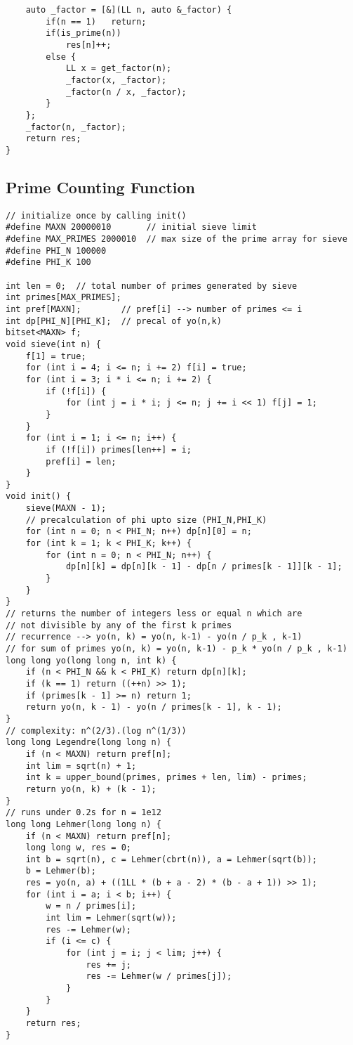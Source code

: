\documentclass[FSZ,a4paper,onesided]{article}
\begin{document}
\begin{multicols*}{\COLS}
\begin{lstlisting}
    auto _factor = [&](LL n, auto &_factor) {
        if(n == 1)   return;
        if(is_prime(n)) 
            res[n]++;
        else {
            LL x = get_factor(n);
            _factor(x, _factor);
            _factor(n / x, _factor);
        }
    };
    _factor(n, _factor);
    return res;
}
\end{lstlisting}
\subsection{Prime Counting Function}
\begin{lstlisting}
// initialize once by calling init()
#define MAXN 20000010       // initial sieve limit
#define MAX_PRIMES 2000010  // max size of the prime array for sieve
#define PHI_N 100000
#define PHI_K 100

int len = 0;  // total number of primes generated by sieve
int primes[MAX_PRIMES];
int pref[MAXN];        // pref[i] --> number of primes <= i
int dp[PHI_N][PHI_K];  // precal of yo(n,k)
bitset<MAXN> f;
void sieve(int n) {
    f[1] = true;
    for (int i = 4; i <= n; i += 2) f[i] = true;
    for (int i = 3; i * i <= n; i += 2) {
        if (!f[i]) {
            for (int j = i * i; j <= n; j += i << 1) f[j] = 1;
        }
    }
    for (int i = 1; i <= n; i++) {
        if (!f[i]) primes[len++] = i;
        pref[i] = len;
    }
}
void init() {
    sieve(MAXN - 1);
    // precalculation of phi upto size (PHI_N,PHI_K)
    for (int n = 0; n < PHI_N; n++) dp[n][0] = n;
    for (int k = 1; k < PHI_K; k++) {
        for (int n = 0; n < PHI_N; n++) {
            dp[n][k] = dp[n][k - 1] - dp[n / primes[k - 1]][k - 1];
        }
    }
}
// returns the number of integers less or equal n which are
// not divisible by any of the first k primes
// recurrence --> yo(n, k) = yo(n, k-1) - yo(n / p_k , k-1)
// for sum of primes yo(n, k) = yo(n, k-1) - p_k * yo(n / p_k , k-1)
long long yo(long long n, int k) {
    if (n < PHI_N && k < PHI_K) return dp[n][k];
    if (k == 1) return ((++n) >> 1);
    if (primes[k - 1] >= n) return 1;
    return yo(n, k - 1) - yo(n / primes[k - 1], k - 1);
}
// complexity: n^(2/3).(log n^(1/3))
long long Legendre(long long n) {
    if (n < MAXN) return pref[n];
    int lim = sqrt(n) + 1;
    int k = upper_bound(primes, primes + len, lim) - primes;
    return yo(n, k) + (k - 1);
}
// runs under 0.2s for n = 1e12
long long Lehmer(long long n) {
    if (n < MAXN) return pref[n];
    long long w, res = 0;
    int b = sqrt(n), c = Lehmer(cbrt(n)), a = Lehmer(sqrt(b));
    b = Lehmer(b);
    res = yo(n, a) + ((1LL * (b + a - 2) * (b - a + 1)) >> 1);
    for (int i = a; i < b; i++) {
        w = n / primes[i];
        int lim = Lehmer(sqrt(w));
        res -= Lehmer(w);
        if (i <= c) {
            for (int j = i; j < lim; j++) {
                res += j;
                res -= Lehmer(w / primes[j]);
            }
        }
    }
    return res;
}
\end{lstlisting}

\end{multicols*}
\end{document}

